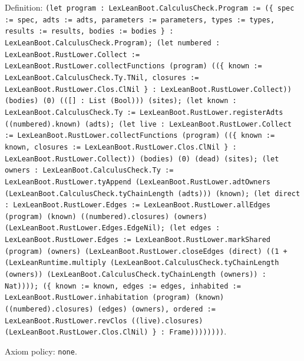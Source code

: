 \documentclass[11pt]{article}
\begin{document}
\noindent Definition: \texttt{(let program : LexLeanBoot.CalculusCheck.Program := (\{ spec := spec, adts := adts, parameters := parameters, types := types, results := results, bodies := bodies \} : LexLeanBoot.CalculusCheck.Program); (let numbered : LexLeanBoot.RustLower.Collect := LexLeanBoot.RustLower.collectFunctions (program) ((\{ known := LexLeanBoot.CalculusCheck.Ty.TNil, closures := LexLeanBoot.RustLower.Clos.ClNil \} : LexLeanBoot.RustLower.Collect)) (bodies) (0) (([] : List (Bool))) (sites); (let known : LexLeanBoot.CalculusCheck.Ty := LexLeanBoot.RustLower.registerAdts ((numbered).known) (adts); (let live : LexLeanBoot.RustLower.Collect := LexLeanBoot.RustLower.collectFunctions (program) ((\{ known := known, closures := LexLeanBoot.RustLower.Clos.ClNil \} : LexLeanBoot.RustLower.Collect)) (bodies) (0) (dead) (sites); (let owners : LexLeanBoot.CalculusCheck.Ty := LexLeanBoot.RustLower.tyAppend (LexLeanBoot.RustLower.adtOwners (LexLeanBoot.CalculusCheck.tyChainLength (adts))) (known); (let direct : LexLeanBoot.RustLower.Edges := LexLeanBoot.RustLower.allEdges (program) (known) ((numbered).closures) (owners) (LexLeanBoot.RustLower.Edges.EdgeNil); (let edges : LexLeanBoot.RustLower.Edges := LexLeanBoot.RustLower.markShared (program) (owners) (LexLeanBoot.RustLower.closeEdges (direct) ((1 + (LexLeanRuntime.multiply (LexLeanBoot.CalculusCheck.tyChainLength (owners)) (LexLeanBoot.CalculusCheck.tyChainLength (owners)) : Nat)))); (\{ known := known, edges := edges, inhabited := LexLeanBoot.RustLower.inhabitation (program) (known) ((numbered).closures) (edges) (owners), ordered := LexLeanBoot.RustLower.revClos ((live).closures) (LexLeanBoot.RustLower.Clos.ClNil) \} : Frame))))))))}.\par
\noindent Axiom policy: \texttt{none}.\par
\end{document}
